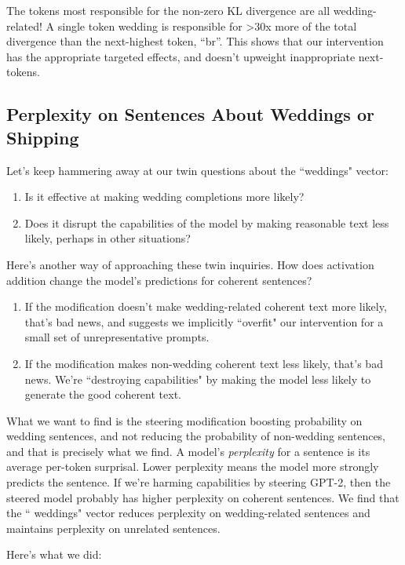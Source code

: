 \documentclass[10pt]{article}
\begin{document}
The tokens most responsible for the non-zero KL divergence are all wedding-related! A single token  wedding is responsible for >30x more of the total divergence than the next-highest token, ``{\textvisiblespace}br''. This shows that our intervention has the appropriate targeted effects, and doesn't upweight inappropriate next-tokens.

\subsection{Perplexity on Sentences About Weddings or Shipping}
Let's keep hammering away at our twin questions about the ``weddings" vector:

\begin{enumerate}
\item Is it effective at making wedding completions more likely?
\item Does it disrupt the capabilities of the model by making reasonable text less likely, perhaps in other situations?
\end{enumerate}

Here's another way of approaching these twin inquiries. How does activation addition change the model's predictions for coherent sentences?

\begin{enumerate}
\item If the modification doesn't make wedding-related coherent text more likely, that's bad news, and suggests we implicitly ``overfit" our intervention for a small set of unrepresentative prompts.  
\item If the modification makes non-wedding coherent text less likely, that's bad news. We're ``destroying capabilities" by making the model less likely to generate the good coherent text. 
\end{enumerate}

What we want to find is the steering modification boosting probability on wedding sentences, and not reducing the probability of non-wedding sentences, and that is precisely what we find. A model's \textit{perplexity} for a sentence is its average per-token surprisal. Lower perplexity means the model more strongly predicts the sentence. If we're harming capabilities by steering GPT-2, then the steered model probably has higher perplexity on coherent sentences. We find that the `` weddings" vector reduces perplexity on wedding-related sentences and maintains perplexity on unrelated sentences.%

Here's what we did:
\end{document}
